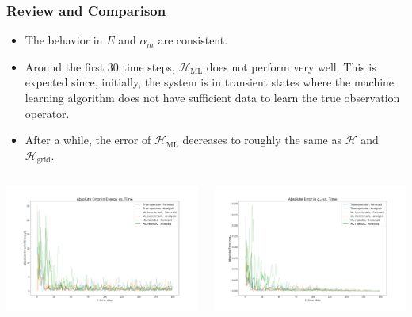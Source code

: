 \documentclass{beamer}
\newcommand{\cH}{\mathcal{H}}
\begin{document}
\begin{frame}
\frametitle{Review and Comparison}
\begin{itemize}
	\item The behavior in $E$ and $\alpha_m$ are consistent.
	\item Around the first 30 time steps, $\cH_{\text{ML}}$ does not perform very well. This is expected since, initially, the system is in transient states where the machine learning algorithm does not have sufficient data to learn the true observation operator.
	\item After a while, the error of $\cH_{\text{ML}}$ decreases to roughly the same as $\cH$ and $\cH_{\text{grid}}$.
\end{itemize}
\begin{columns}
\begin{column}{0.5\linewidth}
\centering
\includegraphics[width=\linewidth]{Figures/AbsoluteError_E_2.png}
\end{column}
\begin{column}{0.5\linewidth}
\centering
\includegraphics[width=\linewidth]{Figures/AbsoluteError_am_2.png}
\end{column}
\end{columns}
\end{frame}
\end{document}
